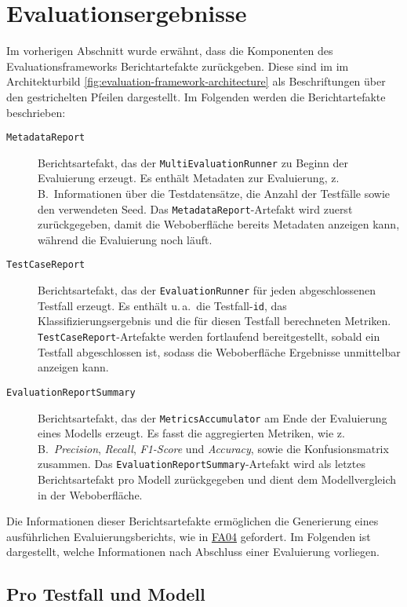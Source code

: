 \section{Evaluationsergebnisse}\label{sec:generierte-resultate}

Im vorherigen Abschnitt wurde erwähnt, dass die Komponenten des Evaluationsframeworks Berichtartefakte zurückgeben. Diese sind im im Architekturbild \ref{fig:evaluation-framework-architecture} als Beschriftungen über den gestrichelten Pfeilen dargestellt. Im Folgenden werden die Berichtartefakte beschrieben:

\begin{description}
    \item[\texttt{MetadataReport}] Berichtsartefakt, das der \texttt{MultiEvaluationRunner} zu Beginn der Evaluierung erzeugt. Es enthält Metadaten zur Evaluierung, z.\,B.\ Informationen über die Testdatensätze, die Anzahl der Testfälle sowie den verwendeten Seed. Das \texttt{MetadataReport}-Artefakt wird zuerst zurückgegeben, damit die Weboberfläche bereits Metadaten anzeigen kann, während die Evaluierung noch läuft.

    \item[\texttt{TestCaseReport}] Berichtsartefakt, das der \texttt{EvaluationRunner} für jeden abgeschlossenen Testfall erzeugt. Es enthält u.\,a.\ die Testfall-\texttt{id}, das Klassifizierungsergebnis und die für diesen Testfall berechneten Metriken. \texttt{TestCaseReport}-Artefakte werden fortlaufend bereitgestellt, sobald ein Testfall abgeschlossen ist, sodass die Weboberfläche Ergebnisse unmittelbar anzeigen kann.

    \item[\texttt{EvaluationReportSummary}] Berichtsartefakt, das der \texttt{MetricsAccumulator} am Ende der Evaluierung eines Modells erzeugt. Es fasst die aggregierten Metriken, wie z.\,B.\ \emph{Precision}, \emph{Recall}, \emph{F1-Score} und \emph{Accuracy}, sowie die Konfusionsmatrix zusammen. Das \texttt{EvaluationReportSummary}-Artefakt wird als letztes Berichtsartefakt pro Modell zurückgegeben und dient dem Modellvergleich in der Weboberfläche.
\end{description}

Die Informationen dieser Berichtsartefakte ermöglichen die Generierung eines ausführlichen Evaluierungsberichts, wie in \hyperlink{FA04}{FA04} gefordert. Im Folgenden ist dargestellt, welche Informationen nach Abschluss einer Evaluierung vorliegen.

\subsection*{Pro Testfall und Modell}

